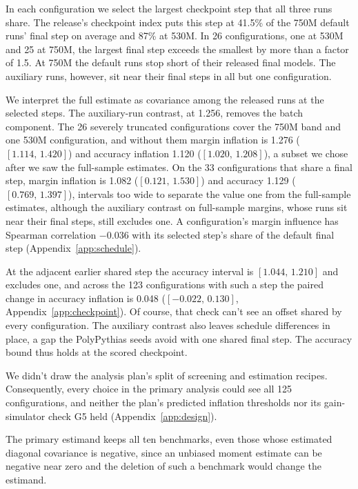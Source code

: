 \documentclass{article}
\newcommand{\ci}[2]{\ensuremath{[#1,\,#2]}}
\begin{document}
In each configuration we select the largest checkpoint step that all three runs share. The release's checkpoint index puts this step at 41.5\% of the 750M default runs' final step on average and 87\% at 530M. In 26 configurations, one at 530M and 25 at 750M, the largest final step exceeds the smallest by more than a factor of 1.5. At 750M the default runs stop short of their released final models. The auxiliary runs, however, sit near their final steps in all but one configuration.

We interpret the full estimate as covariance among the released runs at the selected steps. The auxiliary-run contrast, at 1.256, removes the batch component. The 26 severely truncated configurations cover the 750M band and one 530M configuration, and without them margin inflation is 1.276 (\ci{1.114}{1.420}) and accuracy inflation 1.120 (\ci{1.020}{1.208}), a subset we chose after we saw the full-sample estimates. On the 33 configurations that share a final step, margin inflation is 1.082 (\ci{0.121}{1.530}) and accuracy 1.129 (\ci{0.769}{1.397}), intervals too wide to separate the value one from the full-sample estimates, although the auxiliary contrast on full-sample margins, whose runs sit near their final steps, still excludes one. A configuration's margin influence has Spearman correlation $-0.036$ with its selected step's share of the default final step (Appendix~\ref{app:schedule}).

At the adjacent earlier shared step the accuracy interval is \ci{1.044}{1.210} and excludes one, and across the 123 configurations with such a step the paired change in accuracy inflation is 0.048 (\ci{-0.022}{0.130}, Appendix~\ref{app:checkpoint}). Of course, that check can't see an offset shared by every configuration. The auxiliary contrast also leaves schedule differences in place, a gap the PolyPythias seeds avoid with one shared final step. The accuracy bound thus holds at the scored checkpoint.

We didn't draw the analysis plan's split of screening and estimation recipes. Consequently, every choice in the primary analysis could see all 125 configurations, and neither the plan's predicted inflation thresholds nor its gain-simulator check G5 held (Appendix~\ref{app:design}).

The primary estimand keeps all ten benchmarks, even those whose estimated diagonal covariance is negative, since an unbiased moment estimate can be negative near zero and the deletion of such a benchmark would change the estimand.
\end{document}
